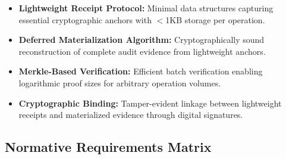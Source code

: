 \documentclass[12pt,a4paper]{article}
\begin{document}
\begin{itemize}
\item \textbf{Lightweight Receipt Protocol:} Minimal data structures capturing essential cryptographic anchors with $<$1KB storage per operation.

\item \textbf{Deferred Materialization Algorithm:} Cryptographically sound reconstruction of complete audit evidence from lightweight anchors.

\item \textbf{Merkle-Based Verification:} Efficient batch verification enabling logarithmic proof sizes for arbitrary operation volumes.

\item \textbf{Cryptographic Binding:} Tamper-evident linkage between lightweight receipts and materialized evidence through digital signatures.
\end{itemize}

\subsection{Normative Requirements Matrix}
\end{document}
